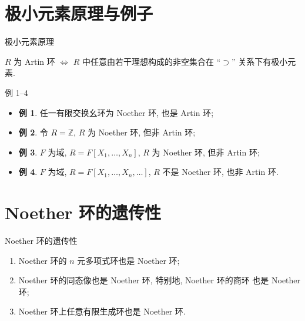 
\section[极小原理]{极小元素原理与例子}


\begin{frame}{极小元素原理}

\begin{lem}[极小元素原理]
$R$ 为 Artin 环 $\iff$ $R$ 中任意由若干理想构成的非空集合在
``$\supset$'' 关系下有极小元素.
\end{lem}

\end{frame}


\begin{frame}{例 1--4}

\begin{itemize}
\item \textbf{例 1}. 任一有限交换幺环为 Noether 环, 也是 Artin 环;
\item \textbf{例 2}. 令 $R = \mathbb{Z}$, $R$ 为 Noether 环, 但非 Artin 环;
\item \textbf{例 3}. $F$ 为域, $R = F[X_1, \dots, X_n]$,
  $R$ 为 Noether 环, 但非 Artin 环;
\item \textbf{例 4}. $F$ 为域, $R = F[X_1, \dots, X_n, \dots]$,
  $R$ 不是 Noether 环, 也非 Artin 环.
\end{itemize}

\end{frame}


\section[遗传性]{Noether 环的遗传性}


\begin{frame}{Noether 环的遗传性}

\begin{lem}
\begin{enumerate}
\item[(i)] Noether 环的 $n$ 元多项式环也是 Noether 环;
\item[(ii)] Noether 环的同态像也是 Noether 环, 特别地, Noether 环的商环
  也是 Noether 环;
\item[(iii)] Noether 环上任意有限生成环也是 Noether 环.
\end{enumerate}
\end{lem}

\end{frame}

